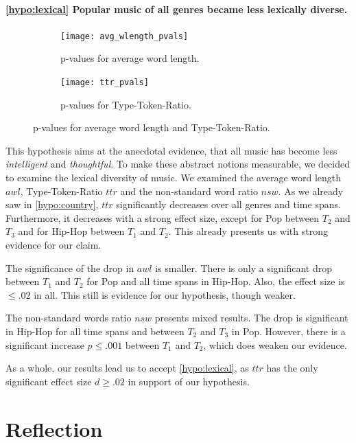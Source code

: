 \documentclass[11pt,a4paper]{article}
\begin{document}
\paragraph{\ref{hypo:lexical} Popular music of all genres became less lexically diverse.}

\begin{figure}[t!]
	\centering
	\begin{subfigure}[t]{0.49\textwidth}
	\centering
	\texttt{[image: avg\_wlength\_pvals]}
	\label{fig:pvals:wlength}
	\caption{p-values for average word length.}
	\end{subfigure}
	\begin{subfigure}[t]{0.49\textwidth}
	\texttt{[image: ttr\_pvals]}
	\label{fig:pvals:ttr}
	\caption{p-values for Type-Token-Ratio.}
	\centering
	\end{subfigure}
	\label{fig:pvals:wlength-ttr}
	\caption{p-values for average word length and Type-Token-Ratio.}
\end{figure}

This hypothesis aims at the anecdotal evidence, that all music has become less \emph{intelligent} and \emph{thoughtful}. To make these abstract notions measurable, we decided to examine the lexical diversity of music. We examined the average word length $awl$, Type-Token-Ratio $ttr$ and the non-standard word ratio $nsw$. As we already saw in \ref{hypo:country}, $ttr$ significantly decreases over all genres and time spans. Furthermore, it decreases with a strong effect size, except for Pop between $T_2$ and $T_3$ and for Hip-Hop between $T_1$ and $T_2$. This already presents us with strong evidence for our claim.

The significance of the drop in $awl$ is smaller. There is only a significant drop between $T_1$ and $T_2$ for Pop and all time spans in Hip-Hop. Also, the effect size is $\leq .02$ in all. This still is evidence for our hypothesis, though weaker.

The non-standard words ratio $nsw$ presents mixed results. The drop is significant in Hip-Hop for all time spans and between $T_2$ and $T_3$ in Pop. However, there is a significant increase $p \leq .001$ between $T_1$ and $T_2$, which does weaken our evidence.

As a whole, our results lead us to accept \ref{hypo:lexical}, as $ttr$ has the only significant effect size $d \geq .02$ in support of our hypothesis.

\section{Reflection}\label{sec:reflection}
\end{document}
